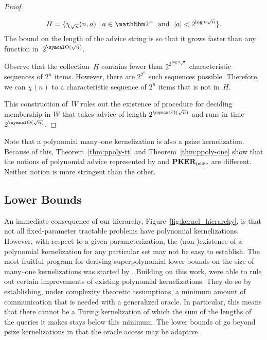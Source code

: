 \begin{proof}
\begin{codelisting}
\begin{codelisting}
\begin{equation*}
        H = \{\chi_{\sqrt{n}}(n, a) \st a \in \binary^+ \reland \length{a} < 2^{\log n \sqrt{n}}\}.
      \end{equation*}
      The bound on the length of the advice string is so that it grows faster than any function in~$2^{\bigO(\sqrt{n})}$.
    \item
      Observe that the collection~$H$ contains fewer than $2^{2^{\log n \sqrt{n}}}$ characteristic sequences of $2^n$ items.
      However, there are $2^{2^n}$ such sequences possible.
      Therefore, we can  $\chi(n)$ to a characteristic sequence of $2^n$ items that is not in~$H$.
    \end{codelisting}
  \end{codelisting}
  This construction of~$W$ rules out the existence of procedure for deciding membership in $W$ that takes advice of length $2^{\bigO(\sqrt{n})}$ and runs in time $2^{\bigO(\sqrt{n})}$.
\end{proof}

Note that a polynomial many--one kernelization is also a psize kernelization.
Because of this, Theorem~\ref{thm:ppoly-tt} and Theorem~\ref{thm:ppoly-one} show that the notions of polynomial advice represented by  and $\textnormal{\textbf{PKER}}_\textnormal{psize}$ are different.
Neither notion is more stringent than the other.
%

\subsection{Lower Bounds}
\label{sec:redundancy:lower_bounds}%
An immediate consequence of our hierarchy, Figure~\ref{fig:kernel_hierarchy}, is that not all fixed-parameter tractable problems have polynomial kernelizations.
However, with respect to a given parameterization, the (non-)existence of a polynomial kernelization for any particular set may not be easy to establish.
The most fruitful program for deriving superpolynomial lower bounds on the size of many--one kernelizations was started by \textcite{bodlaender2009problems}.
Building on this work, \textcite{dell2014satisfiability} were able to rule out certain improvements of existing polynomial kernelizations.
They do so by establishing, under complexity theoretic assumptions, a minimum amount of communication that is needed with a generalized oracle.
In particular, this means that there cannot be a Turing kernelization of which the sum of the lengths of the queries it makes stays below this minimum.
The lower bounds of \citeauthor{dell2014satisfiability} go beyond psize kernelizations in that the oracle access may be adaptive.

